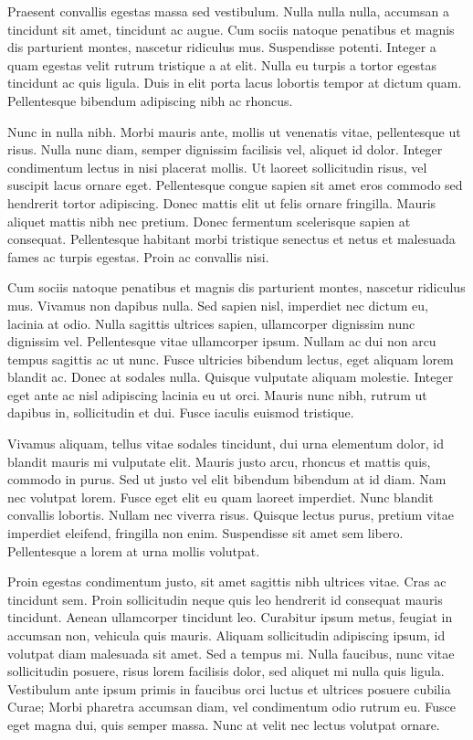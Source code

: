 \documentclass[a4paper]{article}
\begin{document}
Praesent convallis egestas massa sed vestibulum. Nulla nulla nulla, accumsan a tincidunt sit amet, tincidunt ac augue. Cum sociis natoque penatibus et magnis dis parturient montes, nascetur ridiculus mus. Suspendisse potenti. Integer a quam egestas velit rutrum tristique a at elit. Nulla eu turpis a tortor egestas tincidunt ac quis ligula. Duis in elit porta lacus lobortis tempor at dictum quam. Pellentesque bibendum adipiscing nibh ac rhoncus.

Nunc in nulla nibh. Morbi mauris ante, mollis ut venenatis vitae, pellentesque ut risus. Nulla nunc diam, semper dignissim facilisis vel, aliquet id dolor. Integer condimentum lectus in nisi placerat mollis. Ut laoreet sollicitudin risus, vel suscipit lacus ornare eget. Pellentesque congue sapien sit amet eros commodo sed hendrerit tortor adipiscing. Donec mattis elit ut felis ornare fringilla. Mauris aliquet mattis nibh nec pretium. Donec fermentum scelerisque sapien at consequat. Pellentesque habitant morbi tristique senectus et netus et malesuada fames ac turpis egestas. Proin ac convallis nisi.

Cum sociis natoque penatibus et magnis dis parturient montes, nascetur ridiculus mus. Vivamus non dapibus nulla. Sed sapien nisl, imperdiet nec dictum eu, lacinia at odio. Nulla sagittis ultrices sapien, ullamcorper dignissim nunc dignissim vel. Pellentesque vitae ullamcorper ipsum. Nullam ac dui non arcu tempus sagittis ac ut nunc. Fusce ultricies bibendum lectus, eget aliquam lorem blandit ac. Donec at sodales nulla. Quisque vulputate aliquam molestie. Integer eget ante ac nisl adipiscing lacinia eu ut orci. Mauris nunc nibh, rutrum ut dapibus in, sollicitudin et dui. Fusce iaculis euismod tristique.

Vivamus aliquam, tellus vitae sodales tincidunt, dui urna elementum dolor, id blandit mauris mi vulputate elit. Mauris justo arcu, rhoncus et mattis quis, commodo in purus. Sed ut justo vel elit bibendum bibendum at id diam. Nam nec volutpat lorem. Fusce eget elit eu quam laoreet imperdiet. Nunc blandit convallis lobortis. Nullam nec viverra risus. Quisque lectus purus, pretium vitae imperdiet eleifend, fringilla non enim. Suspendisse sit amet sem libero. Pellentesque a lorem at urna mollis volutpat.

Proin egestas condimentum justo, sit amet sagittis nibh ultrices vitae. Cras ac tincidunt sem. Proin sollicitudin neque quis leo hendrerit id consequat mauris tincidunt. Aenean ullamcorper tincidunt leo. Curabitur ipsum metus, feugiat in accumsan non, vehicula quis mauris. Aliquam sollicitudin adipiscing ipsum, id volutpat diam malesuada sit amet. Sed a tempus mi. Nulla faucibus, nunc vitae sollicitudin posuere, risus lorem facilisis dolor, sed aliquet mi nulla quis ligula. Vestibulum ante ipsum primis in faucibus orci luctus et ultrices posuere cubilia Curae; Morbi pharetra accumsan diam, vel condimentum odio rutrum eu. Fusce eget magna dui, quis semper massa. Nunc at velit nec lectus volutpat ornare.
\end{document}
